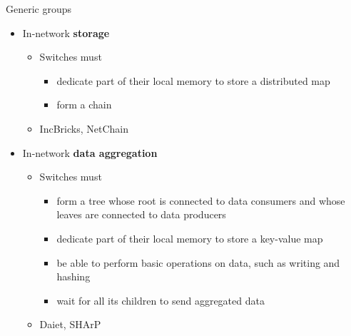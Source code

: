 \begin{frame}{Generic groups}
    
    \setcounter{footnote}{0}

    \begin{itemize}
        \item In-network \textbf{storage}
        \begin{itemize}
        \item Switches must
        \begin{itemize}
            \item dedicate part of their local memory to store a distributed map
            \item form a chain
        \end{itemize}
        \item IncBricks\footnotemark{}, NetChain\footnotemark{}
        \end{itemize}
            \item In-network \textbf{data aggregation}
        \begin{itemize}
        \item Switches must
        \begin{itemize}
            \item form a tree whose root is connected to data consumers and whose leaves are connected to data producers
            \item dedicate part of their local memory to store a key-value map
            \item be able to perform basic operations on data, such as writing and hashing
            \item wait for all its children to send aggregated data
        \end{itemize}
        \item Daiet\footnotemark{}, SHArP\footnotemark{}
        \end{itemize}
    \end{itemize}

    \vspace{5mm}

    \setcounter{footnote}{1}
\end{frame}


